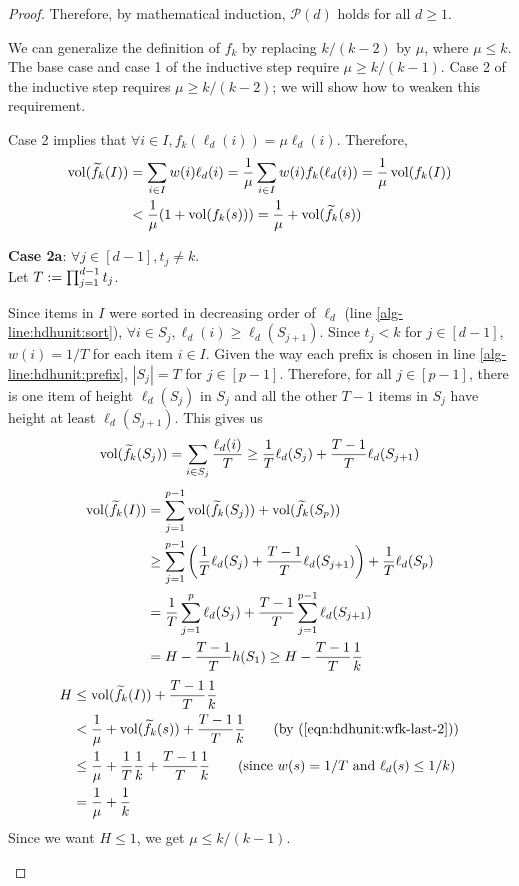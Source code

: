 \begin{proof}
Therefore, by mathematical induction, $\mathcal{P}(d)$ holds for all $d \ge 1$.
\begin{optional}
We can generalize the definition of $f_k$ by replacing $k/(k-2)$ by $\mu$, where $\mu \le k$.
The base case and case 1 of the inductive step require $\mu \ge k/(k-1)$.
Case 2 of the inductive step requires $\mu \ge k/(k-2)$;
we will show how to weaken this requirement.

Case 2 implies that $\forall i \in I, f_k(\ell_d(i)) = \mu\ell_d(i)$. Therefore,
\begin{align}
\operatorname{vol}(\widetilde{f}_{k}(I)) &= \sum_{i \in I} w(i)\ell_d(i)
= \frac{1}{\mu} \sum_{i \in I} w(i)f_k(\ell_d(i))
= \frac{1}{\mu} \operatorname{vol}(f_k(I))
\nonumber
\\ \label{eqn:hdhunit:wfk-last-2}
&< \frac{1}{\mu} (1 + \operatorname{vol}(f_k(s)))
= \frac{1}{\mu} + \operatorname{vol}(\widetilde{f}_{k}(s))
\end{align}

\textbf{Case 2a}: $\forall j \in [d-1], t_j \neq k$.\\
Let $T := \prod_{j=1}^{d-1} t_j$.

Since items in $I$ were sorted in decreasing order of $\ell_d$
(line \ref{alg-line:hdhunit:sort}),
$\forall i \in S_j, \ell_d(i) \ge \ell_d(S_{j+1})$.
Since $t_j < k$ for $j \in [d-1]$, $w(i) = 1/T$ for each item $i \in I$.
Given the way each prefix is chosen in line \ref{alg-line:hdhunit:prefix},
$|S_j| = T$ for $j \in [p-1]$. Therefore, for all $j \in [p-1]$,
there is one item of height $\ell_d(S_j)$ in $S_j$
and all the other $T-1$ items in $S_j$ have height at least $\ell_d(S_{j+1})$.
This gives us
\[ \operatorname{vol}(\widetilde{f}_{k}(S_j)) = \sum_{i \in S_j} \frac{\ell_d(i)}{T}
\ge \frac{1}{T}\ell_d(S_j) + \frac{T-1}{T}\ell_d(S_{j+1}) \]
\begin{align*}
\operatorname{vol}(\widetilde{f}_{k}(I)) &= \sum_{j=1}^{p-1} \operatorname{vol}(\widetilde{f}_{k}(S_j)) + \operatorname{vol}(\widetilde{f}_{k}(S_p))
\\ &\ge \sum_{j=1}^{p-1} \left(\frac{1}{T}\ell_d(S_j) + \frac{T-1}{T}\ell_d(S_{j+1})\right)
    + \frac{1}{T}\ell_d(S_p)
\\ &= \frac{1}{T}\sum_{j=1}^p \ell_d(S_j) + \frac{T-1}{T}\sum_{j=1}^{p-1}\ell_d(S_{j+1})
\\ &= H - \frac{T-1}{T}h(S_1)
\ge H - \frac{T-1}{T}\frac{1}{k}
\end{align*}
\begin{align*}
H &\le \vol(\wfk(I)) + \frac{T-1}{T}\frac{1}{k}
\\ &< \frac{1}{\mu} + \vol(\wfk(s)) + \frac{T-1}{T}\frac{1}{k}
\tag{by (\ref{eqn:hdhunit:wfk-last-2})}
\\ &\le \frac{1}{\mu} + \frac{1}{T}\frac{1}{k} + \frac{T-1}{T}\frac{1}{k}
\tag{since $w(s) = 1/T$ and $\ell_d(s) \le 1/k$}
\\ &= \frac{1}{\mu} + \frac{1}{k}
\end{align*}
Since we want $H \le 1$, we get $\mu \le k/(k-1)$.


\end{optional}
\end{proof}

